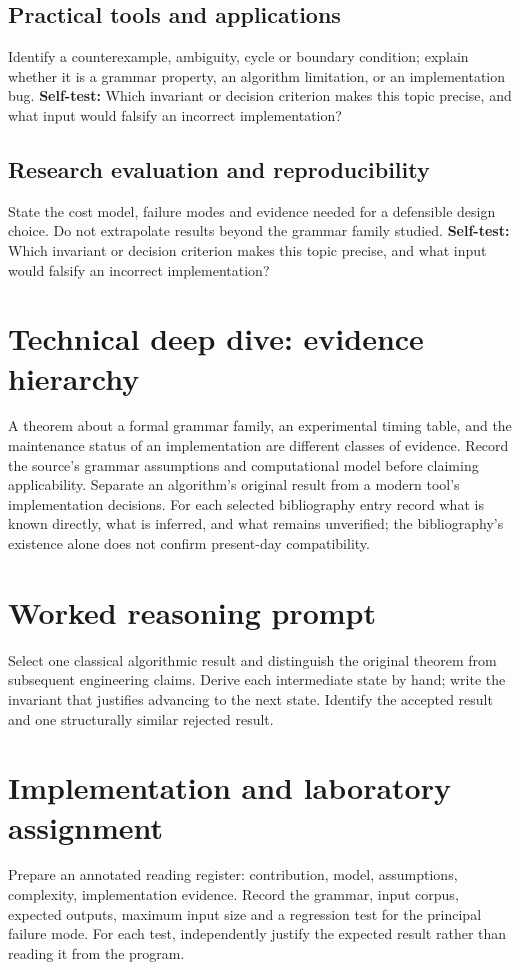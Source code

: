 \documentclass[11pt,letterpaper]{article}
\begin{document}
\subsection{Practical tools and applications}
Identify a counterexample, ambiguity, cycle or boundary condition; explain whether it is a grammar property, an algorithm limitation, or an implementation bug.
\textbf{Self-test:} Which invariant or decision criterion makes this topic precise, and what input would falsify an incorrect implementation?
\subsection{Research evaluation and reproducibility}
State the cost model, failure modes and evidence needed for a defensible design choice. Do not extrapolate results beyond the grammar family studied.
\textbf{Self-test:} Which invariant or decision criterion makes this topic precise, and what input would falsify an incorrect implementation?
\section{Technical deep dive: evidence hierarchy}
A theorem about a formal grammar family, an experimental timing table, and the maintenance status of an implementation are different classes of evidence. Record the source's grammar assumptions and computational model before claiming applicability. Separate an algorithm's original result from a modern tool's implementation decisions. For each selected bibliography entry record what is known directly, what is inferred, and what remains unverified; the bibliography's existence alone does not confirm present-day compatibility.
\section{Worked reasoning prompt}
Select one classical algorithmic result and distinguish the original theorem from subsequent engineering claims. Derive each intermediate state by hand; write the invariant that justifies advancing to the next state. Identify the accepted result and one structurally similar rejected result.
\section{Implementation and laboratory assignment}
Prepare an annotated reading register: contribution, model, assumptions, complexity, implementation evidence. Record the grammar, input corpus, expected outputs, maximum input size and a regression test for the principal failure mode. For each test, independently justify the expected result rather than reading it from the program.
\end{document}
